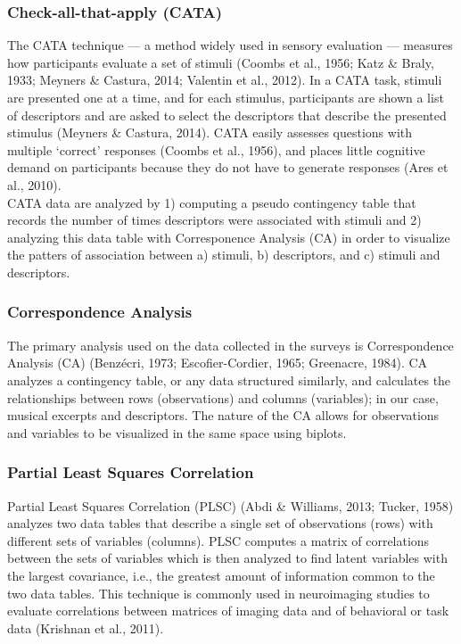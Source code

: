 \documentclass[
  english,
  man,floatsintext]{apa6}
\begin{document}
\hypertarget{check-all-that-apply-cata}{%
\subsubsection{Check-all-that-apply (CATA)}\label{check-all-that-apply-cata}}

The CATA technique --- a method widely used in sensory evaluation --- measures how participants evaluate a set of stimuli (Coombs et al., 1956; Katz \& Braly, 1933; Meyners \& Castura, 2014; Valentin et al., 2012). In a CATA task, stimuli are presented one at a time, and for each stimulus, participants are shown a list of descriptors and are asked to select the descriptors that describe the presented stimulus (Meyners \& Castura, 2014). CATA easily assesses questions with multiple `correct' responses (Coombs et al., 1956), and places little cognitive demand on participants because they do not have to generate responses (Ares et al., 2010).\\
CATA data are analyzed by 1) computing a pseudo contingency table that records the number of times descriptors were associated with stimuli and 2) analyzing this data table with Corresponence Analysis (CA) in order to visualize the patters of association between a) stimuli, b) descriptors, and c) stimuli and descriptors.

\hypertarget{correspondence-analysis}{%
\subsubsection{Correspondence Analysis}\label{correspondence-analysis}}

The primary analysis used on the data collected in the surveys is Correspondence Analysis (CA) (Benzécri, 1973; Escofier-Cordier, 1965; Greenacre, 1984). CA analyzes a contingency table, or any data structured similarly, and calculates the relationships between rows (observations) and columns (variables); in our case, musical excerpts and descriptors. The nature of the CA allows for observations and variables to be visualized in the same space using biplots.

\hypertarget{partial-least-squares-correlation}{%
\subsubsection{Partial Least Squares Correlation}\label{partial-least-squares-correlation}}

Partial Least Squares Correlation (PLSC) (Abdi \& Williams, 2013; Tucker, 1958) analyzes two data tables that describe a single set of observations (rows) with different sets of variables (columns). PLSC computes a matrix of correlations between the sets of variables which is then analyzed to find latent variables with the largest covariance, i.e., the greatest amount of information common to the two data tables. This technique is commonly used in neuroimaging studies to evaluate correlations between matrices of imaging data and of behavioral or task data (Krishnan et al., 2011).
\end{document}
